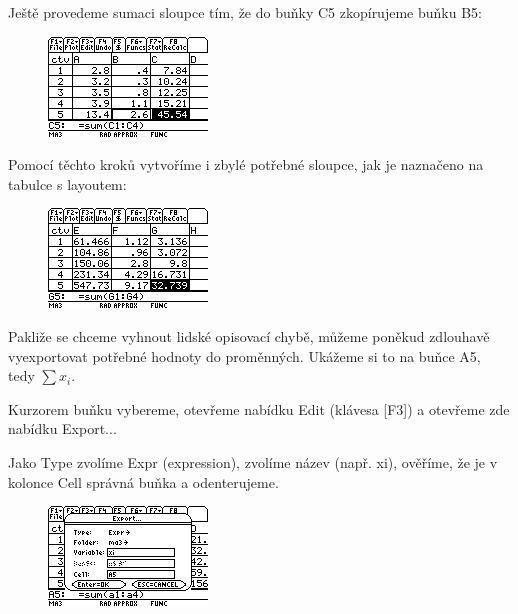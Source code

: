 \documentclass[10pt,a4paper,float]{article}
\begin{document}
Ještě provedeme sumaci sloupce tím, že do buňky C5 zkopírujeme buňku B5:

\begin{figure}[H]
	\centering
	\includegraphics[width=.5\textwidth]{img/CTVERCE6.PNG}
\end{figure}

Pomocí těchto kroků vytvoříme i zbylé potřebné sloupce, jak je naznačeno na tabulce s layoutem:

\begin{figure}[H]
	\centering
	\includegraphics[width=.5\textwidth]{img/CTVERCE7.PNG}
\end{figure}

\pagebreak

Pakliže se chceme vyhnout lidské opisovací chybě, můžeme poněkud zdlouhavě vyexportovat potřebné hodnoty do proměnných. Ukážeme si to na buňce A5, tedy $\sum x_i$.

Kurzorem buňku vybereme, otevřeme nabídku Edit (klávesa [F3]) a otevřeme zde nabídku Export...

Jako Type zvolíme Expr (expression), zvolíme název (např. xi), ověříme, že je v kolonce Cell správná buňka a odenterujeme.

\begin{figure}[H]
	\centering
	\includegraphics[width=.5\textwidth]{img/CTVERCE8.PNG}
\end{figure}
\end{document}

